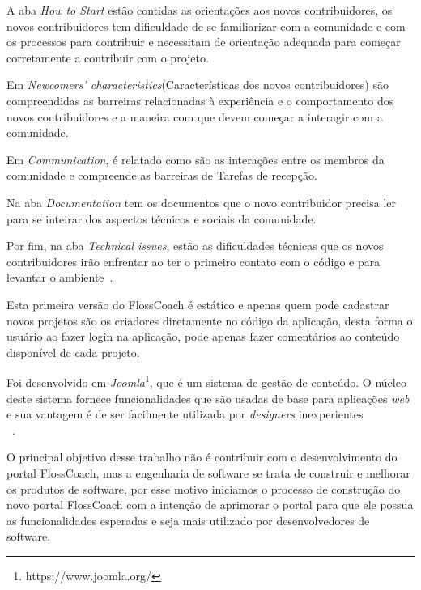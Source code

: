 A aba \textit{How to Start} estão contidas as orientações aos novos contribuidores, os novos
contribuidores tem dificuldade de se familiarizar com a comunidade e com os processos
para contribuir e necessitam de orientação adequada para começar corretamente a
contribuir com o projeto.

Em \textit{Newcomers’ characteristics}(Características dos novos contribuidores) são 
compreendidas as barreiras relacionadas à experiência e o comportamento dos novos 
contribuidores e a maneira com que devem começar a interagir com a comunidade.

Em \textit{Communication}, é relatado como são as interações entre 
os membros da comunidade e compreende as barreiras de Tarefas de recepção.

Na aba \textit{Documentation} tem os documentos que o novo contribuidor precisa ler 
para se inteirar dos aspectos técnicos e sociais da comunidade.

Por fim, na aba \textit{Technical issues}, estão as dificuldades técnicas que os novos
contribuidores irão enfrentar ao ter o primeiro contato com o código e para levantar
o ambiente~\cite{steinmancher2015}.

Esta primeira versão do FlossCoach é estático e apenas quem pode cadastrar novos projetos 
são os criadores diretamente no código da aplicação, desta forma o usuário ao fazer login
na aplicação, pode apenas fazer comentários ao conteúdo disponível de cada projeto.

Foi desenvolvido em \textit{Joomla}\footnote{https://www.joomla.org/}, que 
é um sistema de gestão de conteúdo. O núcleo deste sistema fornece funcionalidades que
são usadas de base para aplicações \textit{web} e sua vantagem é de ser facilmente 
utilizada por \textit{designers} inexperientes\\~\cite{Priefer:2016:JMD:2889160.2889176}.

O principal objetivo desse trabalho não é contribuir com o desenvolvimento do portal FlossCoach,
mas a engenharia de software se trata de construir e melhorar os produtos de software,
por esse motivo iniciamos o processo de construção do novo portal FlossCoach com
a intenção de aprimorar o portal para que ele possua as funcionalidades esperadas e 
seja mais utilizado por desenvolvedores de software.







